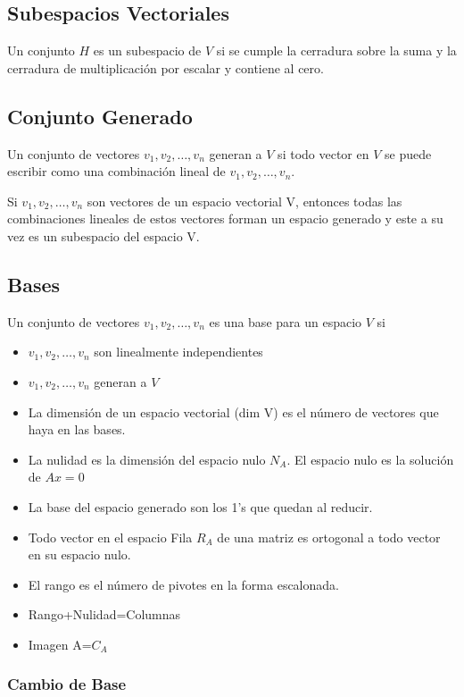 \subsection{Subespacios Vectoriales}
Un conjunto $H$ es un subespacio de $V$ si se cumple la cerradura sobre la suma y la cerradura de multiplicación por escalar y contiene al cero.

\subsection{Conjunto Generado}
Un conjunto de vectores $v_1,v_2,\dots,v_n$ generan a $V$ si todo vector en $V$ se puede escribir como una combinación lineal de $v_1,v_2,\dots,v_n$.

Si $v_1,v_2,\dots,v_n$ son vectores de un espacio vectorial V, entonces todas las combinaciones lineales de estos vectores forman un espacio generado y este a su vez es un subespacio del espacio V.

\subsection{Bases}
Un conjunto de vectores $v_1,v_2,\dots,v_n$ es una base para un espacio $V$ si 
\begin{itemize}
	\item $v_1,v_2,\dots,v_n$ son linealmente independientes
	\item $v_1,v_2,\dots,v_n$ generan a $V$
\end{itemize}

\begin{itemize}
	\item La dimensión de un espacio vectorial (dim V) es el número de vectores que haya en las bases.
	\item La nulidad es la dimensión del espacio nulo $N_A$. El espacio nulo es la solución  de $Ax=0$
	\item La base del espacio generado son los 1's que quedan al reducir.
	\item Todo vector en el espacio Fila $R_A$ de una matriz es ortogonal a todo vector en su espacio nulo.
	\item El rango es el número de pivotes en la forma escalonada.
	\item Rango+Nulidad=Columnas
	\item Imagen A=$C_A$
\end{itemize}

\subsubsection{Cambio de Base}

